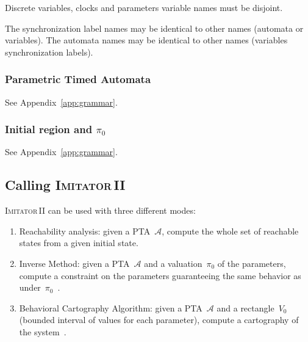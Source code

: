 \documentclass[a4paper,10pt]{article}
\newcommand{\A}{\mathcal{A}}
\newcommand{\hytech}{{\sc HyTech}}
\newcommand{\imitatordeux}{\textsc{Imitator}\,II}
\begin{document}

Discrete variables, clocks and parameters variable names must be disjoint.

The synchronization label names may be identical to other names (automata or variables).
The automata names may be identical to other names (variables synchronization labels).



\subsubsection{Parametric Timed Automata}

See Appendix~\ref{app:grammar}.

\subsubsection{Initial region and $\pi_0$}

See Appendix~\ref{app:grammar}.


\subsection{Calling \imitatordeux}

\imitatordeux{} can be used with three different modes:

\begin{enumerate}
	\item Reachability analysis: given a PTA~$\A$, compute the whole set of reachable states from a given initial state.
	\item Inverse Method: given a PTA~$\A$ and a valuation~$\pi_0$ of the parameters, compute a constraint on the parameters guaranteeing the same behavior as under~$\pi_0$~\cite{acef09}.
	\item Behavioral Cartography Algorithm: given a PTA~$\A$ and a rectangle~$V_0$ (bounded interval of values for each parameter), compute a cartography of the system~\cite{af10}.
\end{enumerate}
\end{document}
